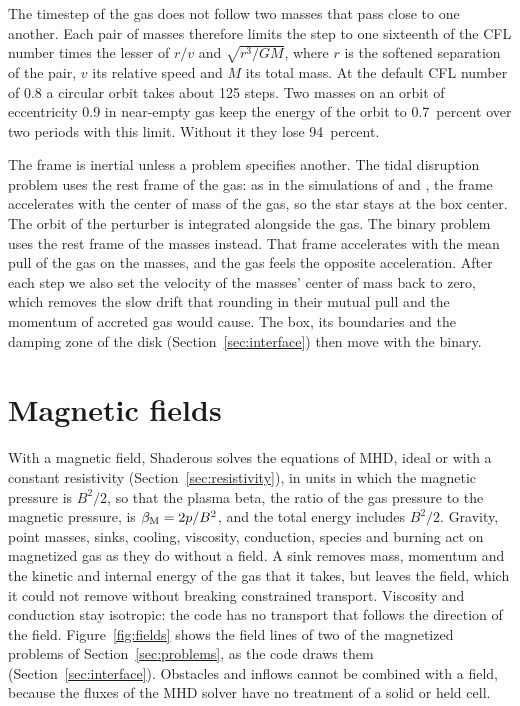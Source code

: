 \documentclass[twocolumn]{aastex701}
\begin{document}
The timestep of the gas does not follow two masses that pass close to one another. Each pair of masses therefore limits the step to one sixteenth of the CFL number times the lesser of $r/v$ and $\sqrt{r^3/GM}$, where $r$ is the softened separation of the pair, $v$ its relative speed and $M$ its total mass. At the default CFL number of 0.8 a circular orbit takes about 125 steps. Two masses on an orbit of eccentricity 0.9 in near-empty gas keep the energy of the orbit to 0.7~percent over two periods with this limit. Without it they lose 94~percent.

The frame is inertial unless a problem specifies another. The tidal disruption problem uses the rest frame of the gas: as in the simulations of \citet{Guillochon2009} and \citet{Guillochon2013}, the frame accelerates with the center of mass of the gas, so the star stays at the box center. The orbit of the perturber is integrated alongside the gas. The binary problem uses the rest frame of the masses instead. That frame accelerates with the mean pull of the gas on the masses, and the gas feels the opposite acceleration. After each step we also set the velocity of the masses' center of mass back to zero, which removes the slow drift that rounding in their mutual pull and the momentum of accreted gas would cause. The box, its boundaries and the damping zone of the disk (Section~\ref{sec:interface}) then move with the binary.

\section{Magnetic fields}
\label{sec:mhd}

With a magnetic field, Shaderous solves the equations of MHD, ideal or with a constant resistivity (Section~\ref{sec:resistivity}), in units in which the magnetic pressure is $B^2/2$, so that the plasma beta, the ratio of the gas pressure to the magnetic pressure, is $\beta_{\rm M} = 2p/B^2$, and the total energy includes $B^2/2$. Gravity, point masses, sinks, cooling, viscosity, conduction, species and burning act on magnetized gas as they do without a field. A sink removes mass, momentum and the kinetic and internal energy of the gas that it takes, but leaves the field, which it could not remove without breaking constrained transport. Viscosity and conduction stay isotropic: the code has no transport that follows the direction of the field. Figure~\ref{fig:fields} shows the field lines of two of the magnetized problems of Section~\ref{sec:problems}, as the code draws them (Section~\ref{sec:interface}). Obstacles and inflows cannot be combined with a field, because the fluxes of the MHD solver have no treatment of a solid or held cell.
\end{document}
